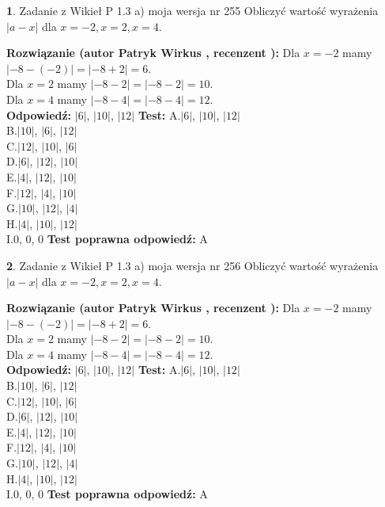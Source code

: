 \documentclass[12pt, a4paper]{article}
\theoremstyle{definition} %
\newtheorem{zad}{}
\newcommand{\zadStart}[1]{\begin{zad}#1\newline}
\newcommand{\zadStop}{\end{zad}}
\newcommand{\rozwStart}[2]{\noindent \textbf{Rozwiązanie (autor #1 , recenzent #2): }\newline}
\newcommand{\rozwStop}{\newline}
\newcommand{\odpStart}{\noindent \textbf{Odpowiedź:}\newline}
\newcommand{\odpStop}{\newline}
\newcommand{\testStart}{\noindent \textbf{Test:}\newline}
\newcommand{\testStop}{\newline}
\newcommand{\kluczStart}{\noindent \textbf{Test poprawna odpowiedź:}\newline}
\newcommand{\kluczStop}{\newline}
\begin{document}
\zadStart{Zadanie z Wikieł P 1.3 a) moja wersja nr 255}
Obliczyć wartość wyrażenia $|a - x|$ dla $x=-2,x=2,x=4$.
\zadStop
\rozwStart{Patryk Wirkus}{}
Dla $x = -2$ mamy $|-8 - (-2)| = |-8 + 2| = 6$.\\
Dla $x = 2$ mamy $|-8 - 2| = |-8 - 2| = 10$.\\
Dla $x = 4$ mamy $|-8 - 4| = |-8 - 4| = 12$.\\
\rozwStop
\odpStart
$|6|$, $|10|$, $|12|$
\odpStop
\testStart
A.$|6|$, $|10|$, $|12|$\\
B.$|10|$, $|6|$, $|12|$\\
C.$|12|$, $|10|$, $|6|$\\
D.$|6|$, $|12|$, $|10|$\\
E.$|4|$, $|12|$, $|10|$\\
F.$|12|$, $|4|$, $|10|$\\
G.$|10|$, $|12|$, $|4|$\\
H.$|4|$, $|10|$, $|12|$\\
I.$0$, $0$, $0$
\testStop
\kluczStart
A
\kluczStop



\zadStart{Zadanie z Wikieł P 1.3 a) moja wersja nr 256}
Obliczyć wartość wyrażenia $|a - x|$ dla $x=-2,x=2,x=4$.
\zadStop
\rozwStart{Patryk Wirkus}{}
Dla $x = -2$ mamy $|-8 - (-2)| = |-8 + 2| = 6$.\\
Dla $x = 2$ mamy $|-8 - 2| = |-8 - 2| = 10$.\\
Dla $x = 4$ mamy $|-8 - 4| = |-8 - 4| = 12$.\\
\rozwStop
\odpStart
$|6|$, $|10|$, $|12|$
\odpStop
\testStart
A.$|6|$, $|10|$, $|12|$\\
B.$|10|$, $|6|$, $|12|$\\
C.$|12|$, $|10|$, $|6|$\\
D.$|6|$, $|12|$, $|10|$\\
E.$|4|$, $|12|$, $|10|$\\
F.$|12|$, $|4|$, $|10|$\\
G.$|10|$, $|12|$, $|4|$\\
H.$|4|$, $|10|$, $|12|$\\
I.$0$, $0$, $0$
\testStop
\kluczStart
A
\kluczStop
\end{document}
